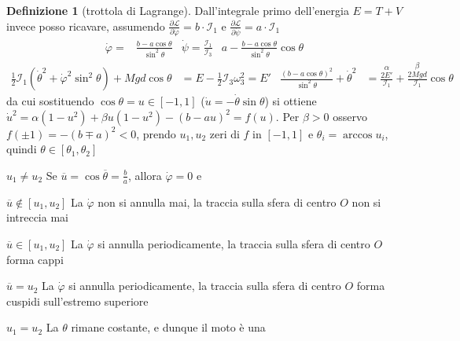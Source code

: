 \documentclass[a4paper,10pt]{article}
\theoremstyle{definition}
\theoremstyle{indentdefinition}
\newtheorem{defn}{Definizione}[section]
\theoremstyle{indenttheorem}
\theoremstyle{myremark}
\theoremstyle{indentgeneral}
\newenvironment{lyxlist}[1]
	{\begin{list}{}
		{\settowidth{\labelwidth}{#1}
		 \setlength{\leftmargin}{\labelwidth}
		 \addtolength{\leftmargin}{\labelsep}
		 \renewcommand{\makelabel}[1]{##1\hfil}}}
	{\end{list}}
\begin{document}
\begin{defn}[trottola di Lagrange]
Dall'integrale primo dell'energia $E=T+V$ invece posso ricavare,
assumendo $\frac{\partial\mathcal{L}}{\partial\dot{\varphi}}=b\cdot\mathcal{I}_{1}$
e $\frac{\partial\mathcal{L}}{\partial\dot{\psi}}=a\cdot\mathcal{I}_{1}$
\begin{align*}
\dot{\varphi}= & \frac{b-a\cos\theta}{\sin^{2}\theta} & \dot{\psi}=\frac{\mathcal{I}_{1}}{\mathcal{I}_{3}} & a-\frac{b-a\cos\theta}{\sin^{2}\theta}\cos\theta
\end{align*}
\begin{align*}
\frac{1}{2}\mathcal{I}_{1}\left(\dot{\theta}^{2}+\dot{\varphi}^{2}\sin^{2}\theta\right)+Mgd\cos\theta & =E-\frac{1}{2}\mathcal{I}_{3}\omega_{3}^{2}=E' & \frac{\left(b-a\cos\theta\right)^{2}}{\sin^{2}\theta}+\dot{\theta}^{2} & =\overset{\alpha}{\boxed{\frac{2E'}{\mathcal{I}_{1}}}}+\overset{\beta}{\boxed{\frac{2Mgd}{\mathcal{I}_{1}}}}\cos\theta
\end{align*}
da cui sostituendo $\cos\theta=u\in\left[-1,1\right]$ ($\dot{u}=-\dot{\theta}\sin\theta$)
si ottiene $\dot{u}^{2}=\alpha\left(1-u^{2}\right)+\beta u\left(1-u^{2}\right)-\left(b-au\right)^{2}=f\left(u\right)$.
Per $\beta>0$ osservo $f\left(\pm1\right)=-\left(b\mp a\right)^{2}<0$,
prendo $u_{1},u_{2}$ zeri di $f$ in $\left[-1,1\right]$ e $\theta_{i}=\arccos u_{i}$,
quindi $\theta\in\left[\theta_{1},\theta_{2}\right]$ 
\end{defn}

\begin{lyxlist}{00.00.0000}
\item [{$u_{1}\neq u_{2}$}] Se $\overline{u}=\cos\overline{\theta}=\frac{b}{a}$,
allora $\dot{\varphi}=0$ e 
\begin{lyxlist}{00.00.0000}
\item [{$\overline{u}\notin\left[u_{1},u_{2}\right]$}] La $\dot{\varphi}$
non si annulla mai, la traccia sulla sfera di centro $O$ non si intreccia
mai
\item [{$\overline{u}\in\left[u_{1},u_{2}\right]$}] La $\dot{\varphi}$
si annulla periodicamente, la traccia sulla sfera di centro $O$ forma
cappi
\item [{$\overline{u}=u_{2}$}] La $\dot{\varphi}$ si annulla periodicamente,
la traccia sulla sfera di centro $O$ forma cuspidi sull'estremo superiore
\end{lyxlist}
\item [{$u_{1}=u_{2}$}] La $\theta$ rimane costante, e dunque il moto
è una 
\end{lyxlist}
\pagebreak{}
\end{document}
